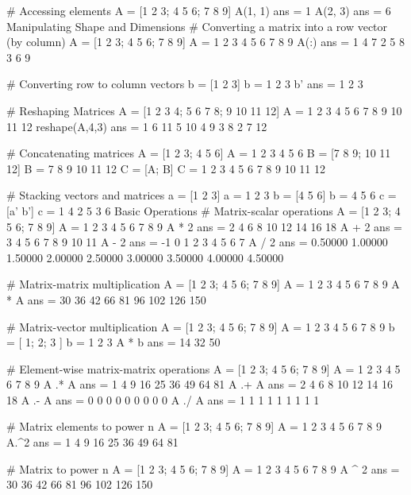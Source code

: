 # Accessing elements
A = [1 2 3; 4 5 6; 7 8 9]
A(1, 1)
ans =  1
A(2, 3)
ans =  6
Manipulating Shape and Dimensions
# Converting a matrix into a row vector (by column)
A = [1 2 3; 4 5 6; 7 8 9]
A =
   1   2   3
   4   5   6
   7   8   9
A(:)
ans =
   1
   4
   7
   2
   5
   8
   3
   6
   9

# Converting row to column vectors
b = [1 2 3]
b =
   1   2   3
b'
ans =
   1
   2
   3

# Reshaping Matrices
A = [1 2 3 4; 5 6 7 8; 9 10 11 12]
A =
    1    2    3    4
    5    6    7    8
    9   10   11   12
reshape(A,4,3)
ans =
    1    6   11
    5   10    4
    9    3    8
    2    7   12

# Concatenating matrices
A = [1 2 3; 4 5 6]
A =
   1   2   3
   4   5   6
B = [7 8 9; 10 11 12]
B =
    7    8    9
   10   11   12
C = [A; B]
C =
    1    2    3
    4    5    6
    7    8    9
   10   11   12

# Stacking vectors and matrices
a = [1 2 3]
a =
   1   2   3
b = [4 5 6]
b =
   4   5   6
c = [a' b']
c =
   1   4
   2   5
   3   6
Basic Operations
# Matrix-scalar operations
A = [1 2 3; 4 5 6; 7 8 9]
A =
   1   2   3
   4   5   6
   7   8   9
A * 2
ans =
    2    4    6
    8   10   12
   14   16   18
A + 2
ans =
    3    4    5
    6    7    8
    9   10   11
A - 2
ans =
  -1   0   1
   2   3   4
   5   6   7
A / 2
ans =
   0.50000   1.00000   1.50000
   2.00000   2.50000   3.00000
   3.50000   4.00000   4.50000

# Matrix-matrix multiplication
A = [1 2 3; 4 5 6; 7 8 9]
A =
   1   2   3
   4   5   6
   7   8   9
A * A
ans =
    30    36    42
    66    81    96
   102   126   150

# Matrix-vector multiplication
A = [1 2 3; 4 5 6; 7 8 9]
A =
   1   2   3
   4   5   6
   7   8   9
b = [ 1; 2; 3 ]
b =
   1
   2
   3
A * b
ans =
   14
   32
   50

# Element-wise matrix-matrix operations
A = [1 2 3; 4 5 6; 7 8 9]
A =
   1   2   3
   4   5   6
   7   8   9
A .* A
ans =
    1    4    9
   16   25   36
   49   64   81
A .+ A
ans =
    2    4    6
    8   10   12
   14   16   18
A .- A
ans =
   0   0   0
   0   0   0
   0   0   0
A ./ A
ans =
   1   1   1
   1   1   1
   1   1   1

# Matrix elements to power n
A = [1 2 3; 4 5 6; 7 8 9]
A =
   1   2   3
   4   5   6
   7   8   9
A.^2
ans =
    1    4    9
   16   25   36
   49   64   81

# Matrix to power n
A = [1 2 3; 4 5 6; 7 8 9]
A =
   1   2   3
   4   5   6
   7   8   9
A ^ 2
ans =
    30    36    42
    66    81    96
   102   126   150


